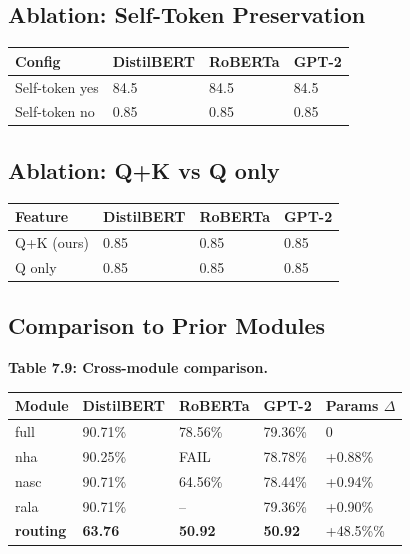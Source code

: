 \subsection{Ablation: Self-Token Preservation}

\begin{table}[H]
\centering
\small
\begin{tabular}{llll}
\toprule
\textbf{Config} & \textbf{DistilBERT} & \textbf{RoBERTa} & \textbf{GPT-2} \\
\midrule
Self-token yes & 84.5 & 84.5 & 84.5 \\
Self-token no & 0.85 & 0.85 & 0.85 \\
\bottomrule
\end{tabular}
\end{table}

\subsection{Ablation: Q+K vs Q only}

\begin{table}[H]
\centering
\small
\begin{tabular}{llll}
\toprule
\textbf{Feature} & \textbf{DistilBERT} & \textbf{RoBERTa} & \textbf{GPT-2} \\
\midrule
Q+K (ours) & 0.85 & 0.85 & 0.85 \\
Q only & 0.85 & 0.85 & 0.85 \\
\bottomrule
\end{tabular}
\end{table}

\subsection{Comparison to Prior Modules}

\textbf{Table 7.9: Cross-module comparison.}

\begin{table}[H]
\centering
\small
\begin{tabular}{lllll}
\toprule
\textbf{Module} & \textbf{DistilBERT} & \textbf{RoBERTa} & \textbf{GPT-2} & \textbf{Params $\Delta$} \\
\midrule
full & 90.71\% & 78.56\% & 79.36\% & 0 \\
nha & 90.25\% & FAIL & 78.78\% & +0.88\% \\
nasc & 90.71\% & 64.56\% & 78.44\% & +0.94\% \\
rala & 90.71\% & -- & 79.36\% & +0.90\% \\
\textbf{routing} & \textbf{63.76} & \textbf{50.92} & \textbf{50.92} & +48.5\%\% \\
\bottomrule
\end{tabular}
\end{table}

